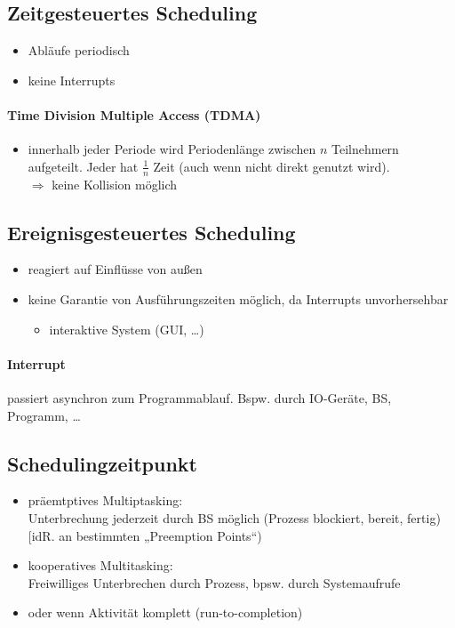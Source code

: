 \documentclass{scrreprt}
\renewcommand{\imptnt}[1]{#1}
\begin{document}
\subsection{Zeitgesteuertes Scheduling}
\begin{itemize}
\item Abläufe periodisch
\item keine Interrupts
\end{itemize}
\paragraph{\imptnt{Time Division Multiple Access (TDMA)}}
\begin{itemize}
\item innerhalb jeder Periode wird Periodenlänge zwischen $n$ Teilnehmern aufgeteilt. Jeder hat $\tfrac{1}{n}$ Zeit (auch wenn nicht direkt genutzt wird). \\
$\Rightarrow$ keine Kollision möglich
\end{itemize}

\subsection{Ereignisgesteuertes Scheduling}
\begin{itemize}
\item reagiert auf Einflüsse von außen
\item keine Garantie von Ausführungszeiten möglich, da Interrupts unvorhersehbar
\begin{itemize}[label = $\to$]
\item interaktive System (GUI, …)
\end{itemize}
\end{itemize}

\paragraph{\imptnt{Interrupt}} passiert asynchron zum Programmablauf. Bspw. durch IO-Geräte, BS, Programm, …

\subsection{Schedulingzeitpunkt}
\begin{itemize}
\item \imptnt{präemtptives Multiptasking}:\\
Unterbrechung jederzeit durch BS möglich (Prozess blockiert, bereit, fertig) [idR. an bestimmten „Preemption Points“)
\item \imptnt{kooperatives Multitasking}:\\
Freiwilliges Unterbrechen durch Prozess, bpsw. durch Systemaufrufe
\item oder wenn Aktivität komplett (run-to-completion)
\end{itemize}
\end{document}
